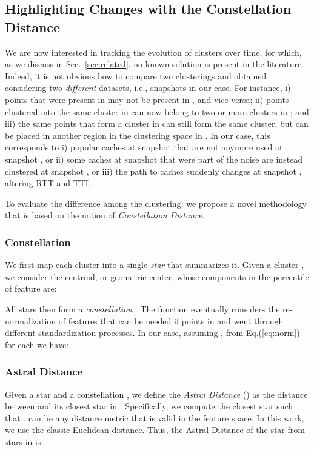\documentclass{acm_proc_article-sp}
\newcommand{\distance}{\textit{Constellation Distance}\xspace}
\begin{document}
\subsection{Highlighting Changes with the Constellation Distance}
\label{sec:distance}
We are now interested in tracking the evolution of clusters over time, for which, as we discuss in Sec.~\ref{sec:related}, no known solution is present in the literature. Indeed, it is not obvious how to compare two clusterings  and  obtained considering two {\it different} datasets, i.e., snapshots in our case.
For instance, i) points that were present in  may not be present in , and vice versa; ii) points clustered into the same cluster in  can now belong to two or more clusters in ; and iii) the same points that form a cluster in  can still form the same cluster, but can be placed in another region in the clustering space in . In our case, this corresponds to i) popular caches at snapshot  that are not anymore used at snapshot , or ii) some caches at snapshot  that were part of the noise are instead clustered at snapshot , or iii) the path to caches suddenly changes at snapshot , altering RTT and TTL.

To evaluate the difference among the clustering, we propose a novel methodology that is based on the notion of \distance.

\subsubsection{Constellation}
We first map each cluster into a single {\it star} that summarizes it. Given a cluster , we consider the centroid, or geometric center,
 whose components  in the  percentile of feature  are:

All stars then form a {\it constellation} .
The  function eventually considers the re-normalization of features that can be needed if points in  and  went through different standardization processes.
In our case, assuming , from Eq.(\ref{eq:norm}) for each  we have:


\subsubsection{Astral Distance}
Given a star  and a constellation , we define the {\it Astral Distance} () 
as the distance between  and its closest star in .
Specifically, we compute the closest star   such that .  can be any distance metric that is valid in the feature space. In this work, we use the classic Euclidean distance.
Thus, the Astral Distance  of the star  from stars in  is
\end{document}
